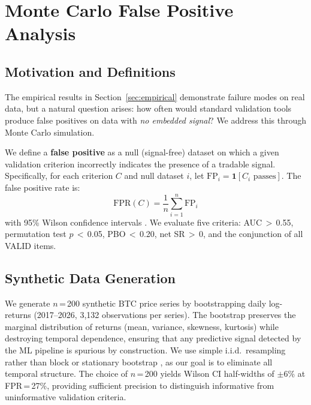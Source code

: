 \documentclass[preprint,12pt,authoryear]{elsarticle}
\begin{document}
\section{Monte Carlo False Positive Analysis}
\label{sec:montecarlo}

\subsection{Motivation and Definitions}

The empirical results in Section~\ref{sec:empirical} demonstrate failure modes on real data, but a natural question arises: how often would standard validation tools produce false positives on data with \textit{no embedded signal}? We address this through Monte Carlo simulation.

We define a \textbf{false positive} as a null (signal-free) dataset on which a given validation criterion incorrectly indicates the presence of a tradable signal. Specifically, for each criterion $C$ and null dataset $i$, let $\mathrm{FP}_i = \mathbf{1}[C_i \text{ passes}]$. The false positive rate is:
\begin{equation}
\mathrm{FPR}(C) = \frac{1}{n}\sum_{i=1}^{n} \mathrm{FP}_i
\label{eq:fpr}
\end{equation}
with 95\% Wilson confidence intervals \citep{wilson1927probable}. We evaluate five criteria: AUC\,$>$\,0.55, permutation test $p$\,$<$\,0.05, PBO\,$<$\,0.20, net SR\,$>$\,0, and the conjunction of all VALID items.

\subsection{Synthetic Data Generation}
We generate $n$\,=\,200 synthetic BTC price series by bootstrapping \citep{efron1993bootstrap} daily log-returns (2017--2026, 3{,}132 observations per series). The bootstrap preserves the marginal distribution of returns (mean, variance, skewness, kurtosis) while destroying temporal dependence, ensuring that any predictive signal detected by the ML pipeline is spurious by construction. We use simple i.i.d.\ resampling rather than block or stationary bootstrap \citep{politis1994stationary}, as our goal is to eliminate all temporal structure. The choice of $n$\,=\,200 yields Wilson CI half-widths of $\pm$6\% at FPR\,=\,27\%, providing sufficient precision to distinguish informative from uninformative validation criteria.
\end{document}
